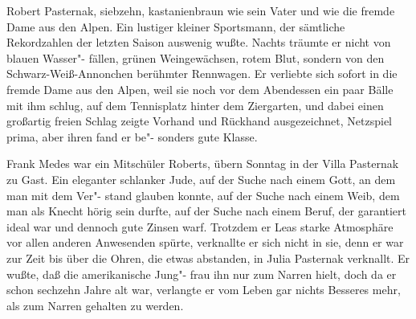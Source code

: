 Robert Pasternak, siebzehn, kastanienbraun wie sein Vater
und wie die fremde Dame aus den Alpen. Ein lustiger kleiner
Sportsmann, der sämtliche Rekordzahlen der letzten Saison
auswenig wußte. Nachts träumte er nicht von blauen Wasser"-%
fällen, grünen Weingewächsen, rotem Blut, sondern von
den Schwarz-Weiß-Annonchen berühmter Rennwagen. Er
verliebte sich sofort in die fremde Dame aus den Alpen,
weil sie noch vor dem Abendessen ein paar Bälle mit ihm
schlug, auf dem Tennisplatz hinter dem Ziergarten, und dabei
einen großartig freien Schlag zeigte\dopp{} Vorhand und Rückhand
ausgezeichnet, Netzspiel prima, aber ihren  fand er be"-%
sonders gute Klasse.

Frank Medes war ein Mitschüler Roberts, übern Sonntag
in der Villa Pasternak zu Gast. Ein eleganter schlanker Jude,
auf der Suche nach einem Gott, an dem man mit dem Ver"-%
stand glauben konnte, auf der Suche nach einem Weib, dem
man als Knecht hörig sein durfte, auf der Suche nach einem
Beruf, der garantiert ideal war und dennoch gute Zinsen
warf. Trotzdem er Leas starke Atmosphäre vor allen anderen
Anwesenden spürte, verknallte er sich nicht in sie, denn er war
zur Zeit bis über die Ohren, die etwas abstanden, in Julia
Pasternak verknallt. Er wußte, daß die amerikanische Jung"-%
frau ihn nur zum Narren hielt, doch da er schon sechzehn
Jahre alt war, verlangte er vom Leben gar nichts Besseres
mehr, als zum Narren gehalten zu werden.

